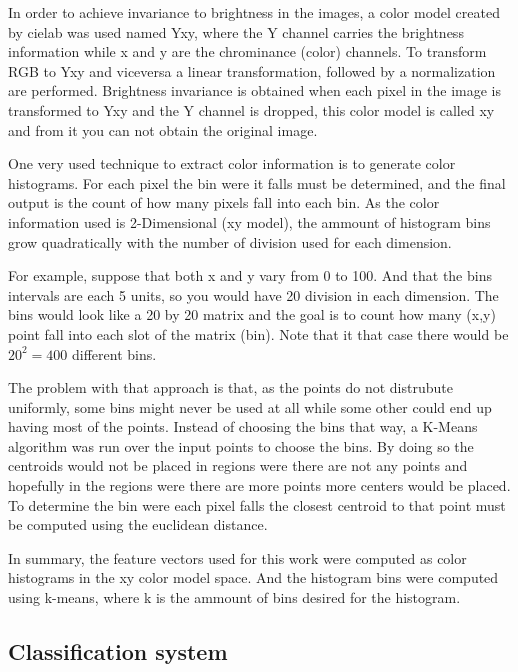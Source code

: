 \documentclass{article}
\begin{document}
In order to achieve invariance to brightness in the images, a color model created by cielab was used %
named Yxy, where the Y channel carries the brightness information while x and y are the chrominance (color) 
channels. To transform RGB to Yxy and viceversa a linear transformation, followed by a normalization are
performed. Brightness invariance is obtained when each pixel in the image is transformed to Yxy and the
Y channel is dropped, this color model is called xy and from it you can not obtain the original image.

One very used technique to extract color information is to generate color histograms. For each pixel
the bin were it falls must be determined, and the final output is the count of how many pixels fall
into each bin. As the color information used is 2-Dimensional (xy model), the ammount of histogram
bins grow quadratically with the number of division used for each dimension. 

For example, suppose that both x and y vary from 0 to 100. And that the bins intervals are each 5
units, so you would have 20 division in each dimension. The bins would look like a 20 by 20 matrix
and the goal is to count how many (x,y) point fall into each slot of the matrix (bin). Note that
it that case there would be $20^2=400$ different bins.

The problem with that approach is that, as the points do not distrubute uniformly, some bins might
never be used at all while some other could end up having most of the points. Instead of choosing the
bins that way, a K-Means algorithm was run over the input points to choose the bins. By doing so
the centroids would not be placed in regions were there are not any points and hopefully in the
regions were there are more points more centers would be placed. To determine the bin were each pixel
falls the closest centroid to that point must be computed using the euclidean distance.

In summary, the feature vectors used for this work were computed as color histograms in the
xy color model space. And the histogram bins were computed using k-means, where k is the
ammount of bins desired for the histogram.


\subsection{Classification system}
\end{document}
